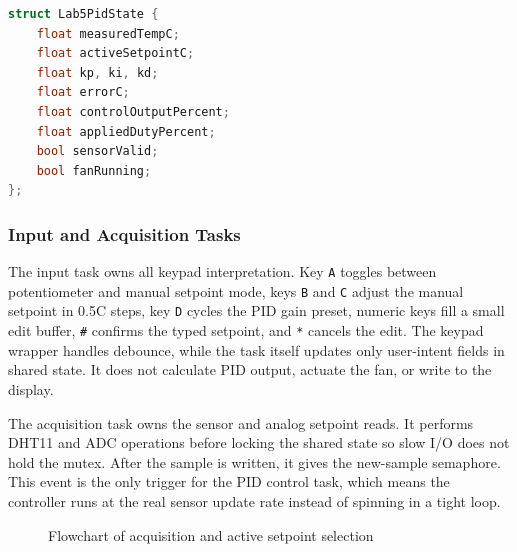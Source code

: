 \begin{lstlisting}[language=C++, caption=Shared PID fields, label=lst:shared_state_fields]
struct Lab5PidState {
    float measuredTempC;
    float activeSetpointC;
    float kp, ki, kd;
    float errorC;
    float controlOutputPercent;
    float appliedDutyPercent;
    bool sensorValid;
    bool fanRunning;
};
\end{lstlisting}

\subsubsection{Input and Acquisition Tasks}

The input task owns all keypad interpretation. Key \texttt{A} toggles between potentiometer and manual setpoint mode, keys \texttt{B} and \texttt{C} adjust the manual setpoint in 0.5\textdegree C steps, key \texttt{D} cycles the PID gain preset, numeric keys fill a small edit buffer, \texttt{\#} confirms the typed setpoint, and \texttt{*} cancels the edit. The keypad wrapper handles debounce, while the task itself updates only user-intent fields in shared state. It does not calculate PID output, actuate the fan, or write to the display.

The acquisition task owns the sensor and analog setpoint reads. It performs DHT11 and ADC operations before locking the shared state so slow I/O does not hold the mutex. After the sample is written, it gives the new-sample semaphore. This event is the only trigger for the PID control task, which means the controller runs at the real sensor update rate instead of spinning in a tight loop.

\begin{figure}[H]
\centering
{}
\caption{Flowchart of acquisition and active setpoint selection}
\label{fig:acquisition_flowchart}
\end{figure}

